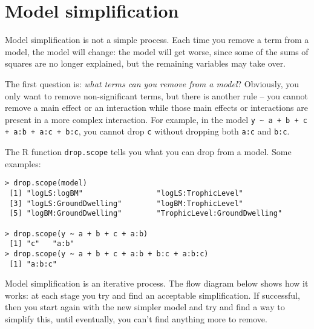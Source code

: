 \section{Model simplification}

Model simplification is not a simple process. Each time you remove a 
term from a model, the model will change: the model will get worse, 
since some of the sums of squares are no longer explained, but the 
remaining variables may take over.

The first question is: {\it what terms can you remove from a model}? 
Obviously, you only want to remove non-significant terms, but there is 
another rule -- you cannot remove a main effect or an interaction while 
those main effects or interactions are present in a more complex 
interaction. For example, in the model {\tt y \textasciitilde{} a + b + 
c + a:b + a:c + b:c}, you cannot drop {\tt c} without dropping both 
{\tt a:c} and {\tt b:c}. 

The R function {\tt drop.scope} tells you what you can drop from a 
model. Some examples:
\begin{lstlisting}
> drop.scope(model)
 [1] "logLS:logBM"                 "logLS:TrophicLevel"         
 [3] "logLS:GroundDwelling"        "logBM:TrophicLevel"         
 [5] "logBM:GroundDwelling"        "TrophicLevel:GroundDwelling"

> drop.scope(y ~ a + b + c + a:b)
 [1] "c"   "a:b"
> drop.scope(y ~ a + b + c + a:b + b:c + a:b:c)
 [1] "a:b:c"
\end{lstlisting}

Model simplification is an iterative process. The flow diagram below 
shows how it works: at each stage you try and find an acceptable 
simplification. If successful, then you start again with the new 
simpler model and try and find a way to simplify this, until 
eventually, you can't find anything more to remove.


